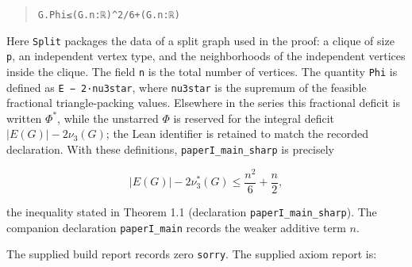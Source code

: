 \documentclass[english,11pt,a4paper]{article}
\begin{document}
\begin{quote}
{\noindent \hspace{1.8em}\nolinkurl{G.Phi}\hspace{0.45em}\nolinkurl{≤}\hspace{0.45em}\nolinkurl{(G.n}\hspace{0.45em}\nolinkurl{:}\hspace{0.45em}\nolinkurl{ℝ)}\hspace{0.45em}\nolinkurl{^}\hspace{0.45em}\nolinkurl{2}\hspace{0.45em}\nolinkurl{/}\hspace{0.45em}\nolinkurl{6}\hspace{0.45em}\nolinkurl{+}\hspace{0.45em}\nolinkurl{(G.n}\hspace{0.45em}\nolinkurl{:}\hspace{0.45em}\nolinkurl{ℝ)}\par
}
\end{quote}

Here \nolinkurl{Split} packages the data of a split graph used in the
proof: a clique of size \nolinkurl{p}, an independent vertex type, and the
neighborhoods of the independent vertices inside the clique. The field
\nolinkurl{n} is the total number of vertices. The quantity \nolinkurl{Phi} is
defined as \texttt{\textbar{}E\textbar{}\ −\ 2·nu3star}, where
\nolinkurl{nu3star} is the supremum of the feasible fractional
triangle-packing values. Elsewhere in the series this fractional deficit
is written \(\Phi^*\), while the unstarred \(\Phi\) is reserved for the
integral deficit \(|E(G)|-2\nu_3(G)\); the Lean identifier is retained
to match the recorded declaration. With these definitions,
\nolinkurl{paperI_main_sharp} is precisely

\[
|E(G)|-2\nu_3^*(G)\le \frac{n^2}{6}+\frac{n}{2},
\]

the inequality stated in Theorem 1.1 (declaration
\nolinkurl{paperI_main_sharp}). The companion declaration
\nolinkurl{paperI_main} records the weaker additive term \(n\).

The supplied build report records zero \nolinkurl{sorry}. The supplied
axiom report is:
\end{document}
